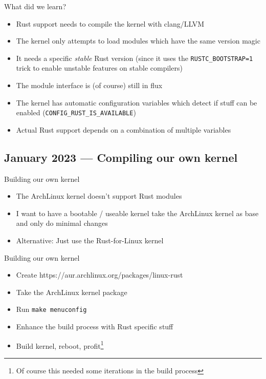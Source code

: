 \begin{frame}[c,fragile]{What did we learn?}
  \small
\begin{itemize}
\item Rust support needs to compile the kernel with clang/LLVM
\item The kernel only attempts to load modules which have the same version magic
\item It needs a specific \emph{stable} Rust version {\footnotesize(since it uses the
\texttt{RUSTC\_BOOTSTRAP=1} trick to enable unstable features on stable compilers)}
\item The module interface is (of course) still in flux
\item The kernel has automatic configuration variables which detect if stuff can be enabled (\texttt{CONFIG\_RUST\_IS\_AVAILABLE})
\item Actual Rust support depends on a combination of multiple variables
\end{itemize}
\end{frame}

\subsection{January 2023 — Compiling our own kernel}

\begin{frame}[c,fragile]{Building our own kernel}
  \begin{itemize}
    \item The ArchLinux kernel doesn't support Rust modules
    \item I want to have a bootable / useable kernel \rightarrow{} take the
      ArchLinux kernel as base and only do minimal changes
    \item Alternative: Just use the Rust-for-Linux kernel
  \end{itemize}
\end{frame}

\begin{frame}[c,fragile]{Building our own kernel}
  \begin{itemize}
    \item Create https://aur.archlinux.org/packages/linux-rust
    \item Take the ArchLinux kernel package
    \item Run \texttt{make menuconfig}
    \item Enhance the build process with Rust specific stuff
    \item Build kernel, reboot, profit\footnote{Of course this needed some iterations in the build process}
  \end{itemize}
\end{frame}

